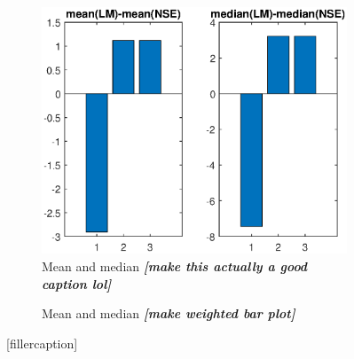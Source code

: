 \begin{figure}[ht]
\begin{subfigure}{0.50\linewidth}
\label{fig:flightCoopGoodMeanMed}
\end{subfigure}
\\
\begin{subfigure}{0.50\linewidth}
\includegraphics[scale=0.6]{figures/flight_results/Coop_bar.eps}
\caption{Mean and median \textit{\textbf{[make this actually a good caption lol]}}}
\label{fig:flightCoopGoodUnweightSum}
\end{subfigure}
\begin{subfigure}{0.50\linewidth}
\caption{Mean and median \textit{\textbf{[make weighted bar plot]}}}
\label{fig:flightCoopGoodweightSum}
\end{subfigure}
\caption{[fillercaption]}
\label{fig:flightCoopMeanMed}
\end{figure}

